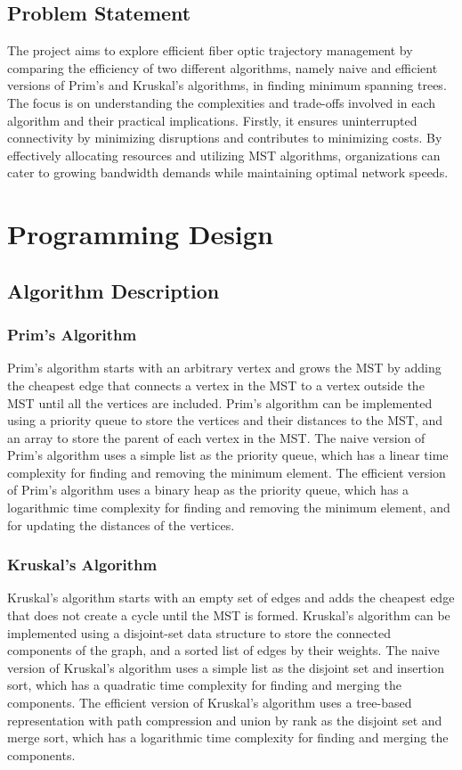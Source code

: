 \documentclass[a4paper, 10pt, twocolumn]{article}
\begin{document}
\subsection{Problem Statement}
The project aims to explore efficient fiber optic trajectory management by comparing the efficiency of two different algorithms, namely naive and efficient versions of Prim's and Kruskal's algorithms, in finding minimum spanning trees. The focus is on understanding the complexities and trade-offs involved in each algorithm and their practical implications. Firstly, it ensures uninterrupted connectivity by minimizing disruptions and contributes to minimizing costs. By effectively allocating resources and utilizing MST algorithms, organizations can cater to growing bandwidth demands while maintaining optimal network speeds.

\section{Programming Design}
\subsection{Algorithm Description}
\subsubsection{Prim’s Algorithm}
Prim’s algorithm starts with an arbitrary vertex and grows the MST by adding the cheapest edge that connects a vertex in the MST to a vertex outside the MST until all the vertices are included. Prim’s algorithm can be implemented using a priority queue to store the vertices and their distances to the MST, and an array to store the parent of each vertex in the MST. The naive version of Prim’s algorithm uses a simple list as the priority queue, which has a linear time complexity for finding and removing the minimum element. The efficient version of Prim’s algorithm uses a binary heap as the priority queue, which has a logarithmic time complexity for finding and removing the minimum element, and for updating the distances of the vertices.
\subsubsection{Kruskal’s Algorithm}
Kruskal’s algorithm starts with an empty set of edges and adds the cheapest edge that does not create a cycle until the MST is formed. Kruskal’s algorithm can be implemented using a disjoint-set data structure to store the connected components of the graph, and a sorted list of edges by their weights. The naive version of Kruskal’s algorithm uses a simple list as the disjoint set and insertion sort, which has a quadratic time complexity for finding and merging the components. The efficient version of Kruskal’s algorithm uses a tree-based representation with path compression and union by rank as the disjoint set and merge sort, which has a logarithmic time complexity for finding and merging the components.
\end{document}
